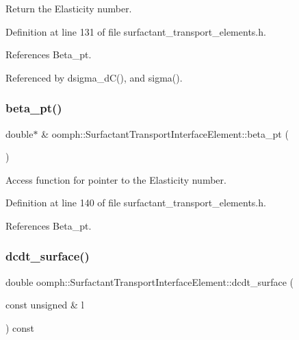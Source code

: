 Return the Elasticity number. 



Definition at line 131 of file surfactant\+\_\+transport\+\_\+elements.\+h.



References Beta\+\_\+pt.



Referenced by dsigma\+\_\+d\+C(), and sigma().

\mbox{\label{classoomph_1_1SurfactantTransportInterfaceElement_a7f64f64c3b5ad3abe6e09bb10a039298}} 
\subsubsection{\texorpdfstring{beta\+\_\+pt()}{beta\_pt()}}
{\footnotesize\ttfamily double$\ast$ \& oomph\+::\+Surfactant\+Transport\+Interface\+Element\+::beta\+\_\+pt (\begin{DoxyParamCaption}{ }\end{DoxyParamCaption})\hspace{0.3cm}{\ttfamily [inline]}}



Access function for pointer to the Elasticity number. 



Definition at line 140 of file surfactant\+\_\+transport\+\_\+elements.\+h.



References Beta\+\_\+pt.

\mbox{\label{classoomph_1_1SurfactantTransportInterfaceElement_a7b5cc851b94d836a3caa2130cbf45bec}} 
\subsubsection{\texorpdfstring{dcdt\+\_\+surface()}{dcdt\_surface()}}
{\footnotesize\ttfamily double oomph\+::\+Surfactant\+Transport\+Interface\+Element\+::dcdt\+\_\+surface (\begin{DoxyParamCaption}\item[{const unsigned \&}]{l }\end{DoxyParamCaption}) const\hspace{0.3cm}{\ttfamily [protected]}}



